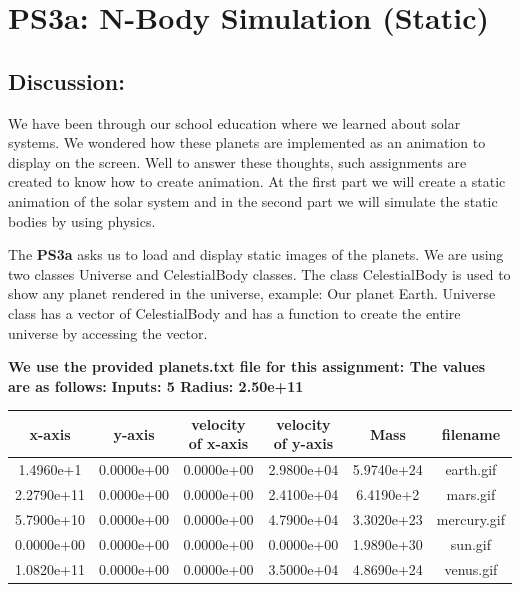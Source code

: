 \section{PS3a: N-Body Simulation (Static)}\label{sec:ps3a}
\graphicspath{{ps3a}}
\subsection{Discussion:}\label{sec:ps3a:disc}
We have been through our school education where we learned about solar systems. We wondered how these planets are implemented as an animation to display on the screen. Well to answer these thoughts, such assignments are created to know how to create animation. At the first part we will create a static animation of the solar system and in the second part we will simulate the static bodies by using physics.


    The \textbf{PS3a} asks us to load and display static images of the planets.
    We are using two classes Universe and CelestialBody classes. The class CelestialBody is used to show any planet rendered in the universe, example: Our planet Earth. Universe class has a vector of CelestialBody and has a function to create the entire universe by accessing the vector.
    
    \textbf{We use the provided planets.txt file for this assignment: The values are as follows: } \newline
    \textbf{Inputs: 5 \newline Radius: 2.50e+11 }
    \begin{center}
 \begin{tabular}{||c c c c c c||} 
 \hline
 x-axis & y-axis & velocity of x-axis & velocity of y-axis & Mass & filename \\ [0.5ex] 
 \hline\hline
 1.4960e+1 & 0.0000e+00 & 0.0000e+00 & 2.9800e+04 & 5.9740e+24 &  earth.gif  \\ 
 \hline
 2.2790e+11 & 0.0000e+00 & 0.0000e+00 & 2.4100e+04 & 6.4190e+2 &  mars.gif  \\ 
 \hline
 5.7900e+10 & 0.0000e+00 & 0.0000e+00 &  4.7900e+04 &  3.3020e+23 &  mercury.gif  \\ 
 \hline
0.0000e+00 & 0.0000e+00 & 0.0000e+00 & 0.0000e+00 & 1.9890e+30 &  sun.gif  \\ 
 \hline
1.0820e+11  & 0.0000e+00 & 0.0000e+00 & 3.5000e+04 & 4.8690e+24 &  venus.gif  \\  
 \hline
\end{tabular}
\end{center}



